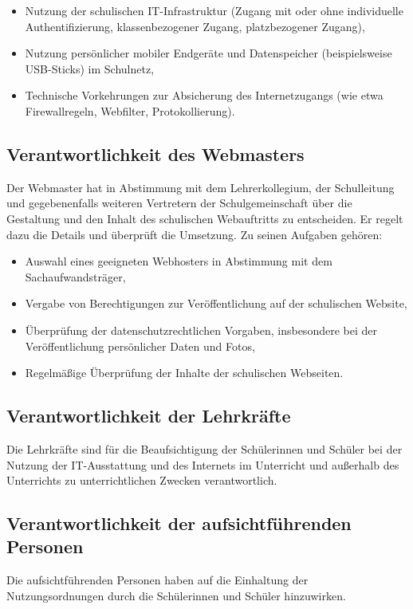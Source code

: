 \documentclass[a4paper, parskip]{scrartcl}
\begin{document}
\begin{itemize}
	\item{Nutzung der schulischen IT-Infrastruktur (Zugang mit oder ohne
		individuelle Authentifizierung, klassenbezogener Zugang,
	platzbezogener Zugang),}
	\item{Nutzung persönlicher mobiler Endgeräte und Datenspeicher
		(beispielsweise USB-Sticks) im Schulnetz,}
	\item{Technische Vorkehrungen zur Absicherung des Internetzugangs (wie
		etwa Firewallregeln, Webfilter, Protokollierung).}
\end{itemize}

\subsection{Verantwortlichkeit des Webmasters}
Der Webmaster hat in Abstimmung mit dem Lehrerkollegium, der Schulleitung und
gegebenenfalls weiteren Vertretern der Schulgemeinschaft über die Gestaltung
und den Inhalt des schulischen Webauftritts zu entscheiden. Er regelt dazu die
Details und überprüft die Umsetzung. Zu seinen Aufgaben gehören:

\begin{itemize}
	\item{Auswahl eines geeigneten Webhosters in Abstimmung mit dem
		Sachaufwandsträger,}
	\item{Vergabe von Berechtigungen zur Veröffentlichung auf der
		schulischen Website,}
	\item{Überprüfung der datenschutzrechtlichen Vorgaben, insbesondere bei
		der Veröffentlichung persönlicher Daten und Fotos,}
	\item{Regelmäßige Überprüfung der Inhalte der schulischen Webseiten.}
\end{itemize}

\subsection{Verantwortlichkeit der Lehrkräfte}
Die Lehrkräfte sind für die Beaufsichtigung der Schülerinnen und Schüler bei
der Nutzung der IT-Ausstattung und des Internets im Unterricht und außerhalb
des Unterrichts zu unterrichtlichen Zwecken verantwortlich.
\subsection{Verantwortlichkeit der aufsichtführenden Personen}
Die aufsichtführenden Personen haben auf die Einhaltung der Nutzungsordnungen
durch die Schülerinnen und Schüler hinzuwirken.
\end{document}
